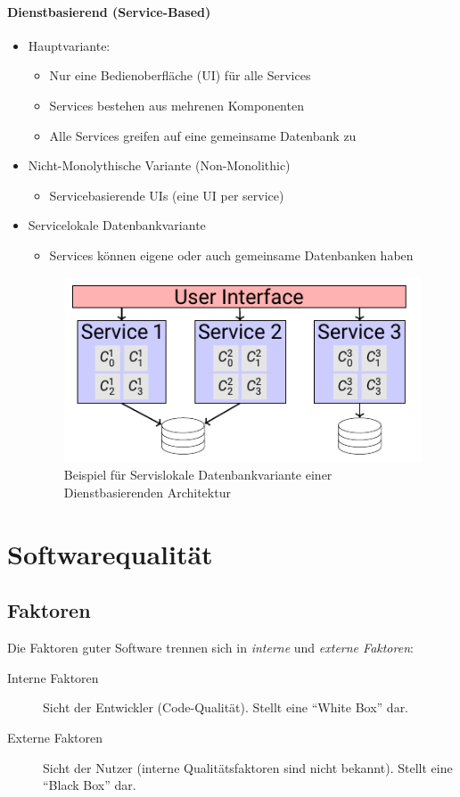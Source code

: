 \documentclass[ngerman]{tuda_summary}
\begin{document}
\paragraph{Dienstbasierend (Service-Based)}
\begin{itemize}
    \item Hauptvariante: \begin{itemize}
        \item Nur eine Bedienoberfläche (UI) für alle Services
        \item Services bestehen aus mehrenen Komponenten
        \item Alle Services greifen auf eine gemeinsame Datenbank zu
    \end{itemize}
    \item Nicht-Monolythische Variante (Non-Monolithic)\begin{itemize}
        \item Servicebasierende UIs (eine UI per service)
    \end{itemize}
    \item Servicelokale Datenbankvariante\begin{itemize}
        \item Services können eigene oder auch gemeinsame Datenbanken haben
    \end{itemize}
    \begin{figure}[ht]
        \centering
        \includegraphics{bilder/service_local_service_based_architecture_style.pdf}
        \caption{Beispiel für Servislokale Datenbankvariante einer Dienstbasierenden Architektur}
    \end{figure}
\end{itemize}

\clearpage
\section{Softwarequalität}
\subsection{Faktoren}
Die Faktoren guter Software trennen sich in \textit{interne} und \textit{externe Faktoren}:
\begin{description}
    \item[Interne Faktoren] Sicht der Entwickler (Code-Qualität). Stellt eine \enquote{White Box} dar.
    \item[Externe Faktoren] Sicht der Nutzer (interne Qualitätsfaktoren sind nicht bekannt). Stellt eine \enquote{Black Box} dar.
\end{description}
\end{document}

